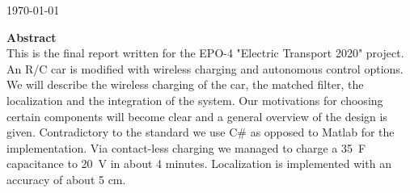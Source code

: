 \documentclass[12pt]{scrreprt}
\begin{document}
\begin{titlepage}


{\large \today}\\ [1.5cm]


 
% 
\vspace{3cm} %

\textbf{Abstract} \\ 
This is the final report written for the EPO-4 "Electric Transport 2020" project. 
An R/C car is modified with wireless charging and autonomous control options. 
We will describe the wireless charging of the car, the matched filter, the localization and the integration of the system. %
Our motivations for choosing certain components will become clear and a general overview of the design is given. 
Contradictory to the standard we use C\# as opposed to Matlab for the implementation. 
Via contact-less charging we managed to charge a \SI{35}{\farad} capacitance to \SI{20}{\volt} in about 4 minutes. Localization is implemented with an accuracy of about 5 cm.


\vfill %

\end{titlepage}
\end{document}
